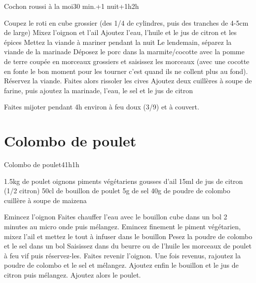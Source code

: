 {\begin{recette}{Cochon roussi à la moi}{}{30 min.+1 nuit+1h}{2h}
\begin{preparation}
\etape Coupez le roti en cube grossier (des 1/4 de cylindres, puis des tranches de 4-5cm de large)
\etape Mixez l'oignon et l'ail
\etape Ajoutez l'eau, l'huile et le jus de citron et les épices
\etape Mettez la viande à mariner pendant la nuit
\etape Le lendemain, séparez la viande de la marinade
\etape Déposez le porc dans la marmite/cocotte avec la pomme de terre coupée en morceaux grossiers et saisissez les morceaux (avec une cocotte en fonte le bon moment pour les tourner c'est quand ils ne collent plus au fond).
\etape Réservez la viande. Faites alors rissoler les cives
\etape Ajoutez deux cuillères à soupe de farine, puis ajoutez la marinade, l'eau, le sel et le jus de citron
\end{preparation}

\begin{cuisson}
Faites mijoter pendant 4h environ à feu doux (3/9) et à couvert.
\end{cuisson}
\end{recette}

\section{Colombo de poulet}
\begin{recette}{Colombo de poulet}{4}{1h}{1h}
\begin{ingredients}
\ingredient 1.5kg de poulet
 oignons
 piments végétariens
 gousses d'ail
\ingredient 15ml de jus de citron (1/2 citron)
\ingredient 50cl de bouillon de poulet
\ingredient 5g de sel
\ingredient 40g de poudre de colombo
 cuillère à soupe de maizena
\end{ingredients}


\begin{preparation}
\etape Emincez l'oignon
\etape Faites chauffer l'eau avec le bouillon cube dans un bol 2 minutes au micro onde puis mélangez. 
\etape Emincez finement le piment végétarien, mixez l'ail et mettez le tout à infuser dans le bouillon
\etape Pesez la poudre de colombo et le sel dans un bol
\etape Saisissez dans du beurre ou de l'huile les morceaux de poulet à feu vif puis réservez-les.
\etape Faites revenir l'oignon.
\etape Une fois revenus, rajoutez la poudre de colombo et le sel et mélangez. 
\etape Ajoutez enfin le bouillon et le jus de citron puis mélangez. Ajoutez alors le poulet.
\end{preparation}


\end{recette}}
